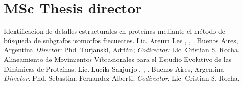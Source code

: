 	\pagebreak[3]

	\bibliographyunit
	\begin{bibunit}[plain]
		\nocite{*}
		\putbib[csrocha]
	\end{bibunit}

	\pagebreak[3]

\section{MSc Thesis director}

	{Identificacion de detalles estructurales en proteínas mediante el método de búsqueda de subgrafos isomorfos frecuentes. Lic. Areum Lee}
	{\DC, \FCEN, \UBA.}
	{Buenos Aires, Argentina}
	{}
	{\emph{Director:} Phd. Turjanski, Adrián; \emph{Codirector:} Lic. Cristian S. Rocha.}
	{Alineamiento de Movimientos Vibracionales para el Estudio Evolutivo de las Dinámicas de Proteínas. Lic. Lucila Sanjurjo} 
	{\DC, \FCEN, \UBA.}
	{Buenos Aires, Argentina}
	{}
	{\emph{Director:} Phd. Sebastian Fernandez Alberti; \emph{Codirector:} Lic. Cristian S. Rocha.}

\label{cientificos:hasta}



